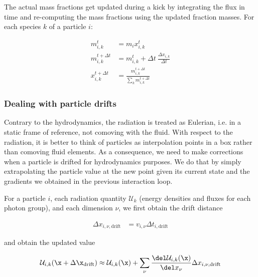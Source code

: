 The actual mass fractions get updated during a kick by integrating the flux in time and re-computing the mass fractions using the updated fraction masses. For each species $k$ of a particle $i$:

\begin{align}
m_{i,k}^{t} &= m_i  x_{i,k}^{t} \\
m_{i,k}^{t + \Delta t} &= m_{i,k}^{t}  + \Delta t \ \frac{\Delta x_{i,k}}{\Delta t} \\
x_{i,k}^{t + \Delta t} &= \frac{m_{i,k}^{t + \Delta t}}{\sum_k m_{i,k}^{t + \Delta t}}
\end{align}







\subsubsection{Dealing with particle drifts}


Contrary to the hydrodynamics, the radiation is treated as Eulerian, i.e. in a static frame of reference, not comoving with the fluid. With respect to the radiation, it is better to think of particles as interpolation points in a box rather than comoving fluid elements. As a consequence, we need to make corrections when a particle is drifted for hydrodynamics purposes. We do that by simply extrapolating the particle value at the new point given its current state and the gradients we obtained in the previous interaction loop.

For a particle $i$, each radiation quantity $\mathcal{U}_k$ (energy densities and fluxes for each photon group), and each dimension $\nu$, we first obtain the drift distance

\begin{align}
\Delta x_{i,\nu,\text{drift}} &= v_{i,\nu} \Delta t_{i,\text{drift}}
\end{align}

and obtain the updated value

\begin{align}
\mathcal{U}_{i,k} (\x + \Delta \x_{\text{drift}}) \approx \mathcal{U}_{i,k} (\x) + \sum_\nu \frac{\del \mathcal{U}_{i,k}(\x)}{\del x_\nu} \Delta x_{i,\nu,\text{drift}}
\end{align}









